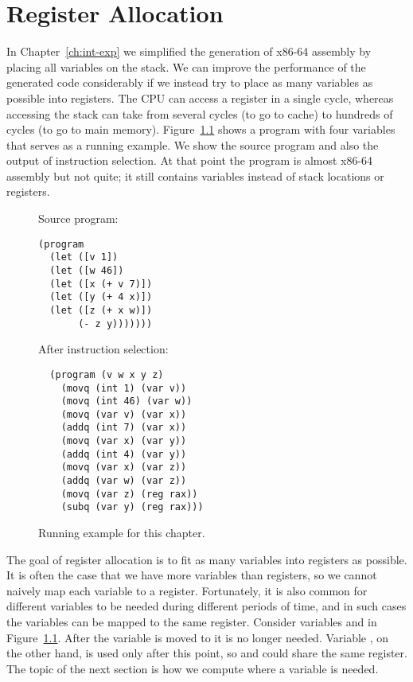 \documentclass[11pt]{book}
\begin{document}

\chapter{Register Allocation}
\label{ch:register-allocation}

In Chapter~\ref{ch:int-exp} we simplified the generation of x86-64
assembly by placing all variables on the stack. We can improve the
performance of the generated code considerably if we instead try to
place as many variables as possible into registers.  The CPU can
access a register in a single cycle, whereas accessing the stack can
take from several cycles (to go to cache) to hundreds of cycles (to go
to main memory).  Figure~\ref{fig:reg-eg} shows a program with four
variables that serves as a running example. We show the source program
and also the output of instruction selection. At that point the
program is almost x86-64 assembly but not quite; it still contains
variables instead of stack locations or registers.

\begin{figure}
\begin{minipage}{0.45\textwidth}
Source program:
\begin{lstlisting}
(program
  (let ([v 1])
  (let ([w 46])
  (let ([x (+ v 7)])
  (let ([y (+ 4 x)])
  (let ([z (+ x w)])
       (- z y)))))))
\end{lstlisting}
\end{minipage}
\begin{minipage}{0.45\textwidth}
After instruction selection:
\begin{lstlisting}
  (program (v w x y z)
    (movq (int 1) (var v))
    (movq (int 46) (var w))
    (movq (var v) (var x))
    (addq (int 7) (var x))
    (movq (var x) (var y))
    (addq (int 4) (var y))
    (movq (var x) (var z))
    (addq (var w) (var z))
    (movq (var z) (reg rax))
    (subq (var y) (reg rax)))
\end{lstlisting}
\end{minipage}
\caption{Running example for this chapter.}
\label{fig:reg-eg}
\end{figure}

The goal of register allocation is to fit as many variables into
registers as possible. It is often the case that we have more
variables than registers, so we cannot naively map each variable to a
register. Fortunately, it is also common for different variables to be
needed during different periods of time, and in such cases the
variables can be mapped to the same register.  Consider variables
 and  in Figure~\ref{fig:reg-eg}.  After the variable
 is moved to  it is no longer needed.  Variable
, on the other hand, is used only after this point, so
 and  could share the same register. The topic of the
next section is how we compute where a variable is needed.
\end{document}
